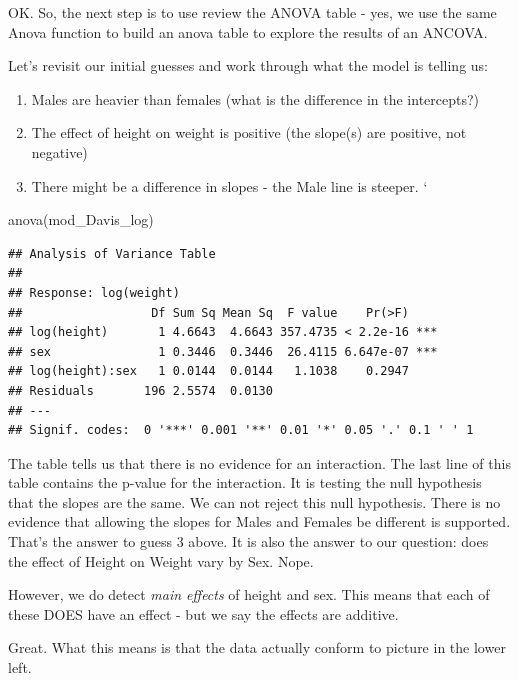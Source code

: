 \documentclass[
]{book}
\newenvironment{Shaded}{\begin{snugshade}}{\end{snugshade}}
\newcommand{\FunctionTok}[1]{\textcolor[rgb]{0.00,0.00,0.00}{#1}}
\newcommand{\NormalTok}[1]{#1}
\providecommand{\tightlist}{%
  \setlength{\itemsep}{0pt}\setlength{\parskip}{0pt}}
\begin{document}
OK. So, the next step is to use review the ANOVA table - yes, we use the same Anova function to build an anova table to explore the results of an ANCOVA.

Let's revisit our initial guesses and work through what the model is telling us:

\begin{enumerate}
\def\labelenumi{\arabic{enumi}.}
\tightlist
\item
  Males are heavier than females (what is the difference in the intercepts?)
\item
  The effect of height on weight is positive (the slope(s) are positive, not negative)
\item
  There might be a difference in slopes - the Male line is steeper.
  `
\end{enumerate}

\begin{Shaded}
\begin{Highlighting}[]
\FunctionTok{anova}\NormalTok{(mod\_Davis\_log)}
\end{Highlighting}
\end{Shaded}

\begin{verbatim}
## Analysis of Variance Table
## 
## Response: log(weight)
##                  Df Sum Sq Mean Sq  F value    Pr(>F)    
## log(height)       1 4.6643  4.6643 357.4735 < 2.2e-16 ***
## sex               1 0.3446  0.3446  26.4115 6.647e-07 ***
## log(height):sex   1 0.0144  0.0144   1.1038    0.2947    
## Residuals       196 2.5574  0.0130                       
## ---
## Signif. codes:  0 '***' 0.001 '**' 0.01 '*' 0.05 '.' 0.1 ' ' 1
\end{verbatim}

The table tells us that there is no evidence for an interaction. The last line of this table contains the p-value for the interaction. It is testing the null hypothesis that the slopes are the same. We can not reject this null hypothesis. There is no evidence that allowing the slopes for Males and Females be different is supported. That's the answer to guess 3 above. It is also the answer to our question: does the effect of Height on Weight vary by Sex. Nope.

However, we do detect \emph{main effects} of height and sex. This means that each of these DOES have an effect - but we say the effects are additive.

Great. What this means is that the data actually conform to picture in the lower left.
\end{document}
